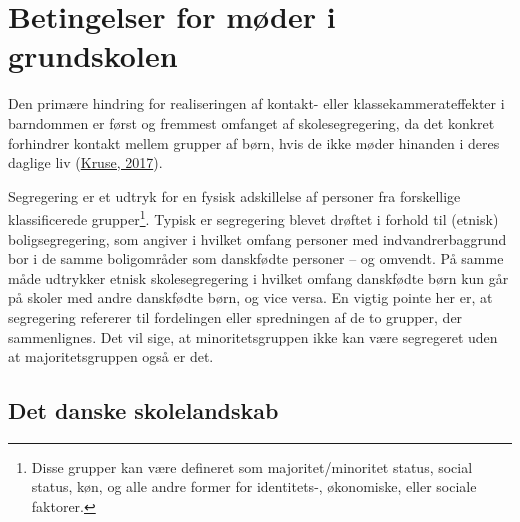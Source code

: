 \documentclass[
]{book}
\begin{document}
\hypertarget{betingelser-for-muxf8der-i-grundskolen}{%
\section{Betingelser for møder i grundskolen}\label{betingelser-for-muxf8der-i-grundskolen}}

Den primære hindring for realiseringen af kontakt- eller klassekammerateffekter i barndommen er først og fremmest omfanget af skolesegregering, da det konkret forhindrer kontakt mellem grupper af børn, hvis de ikke møder hinanden i deres daglige liv (\protect\hyperlink{ref-kruse2017}{Kruse, 2017}).

Segregering er et udtryk for en fysisk adskillelse af personer fra forskellige klassificerede grupper\footnote{Disse grupper kan være defineret som majoritet/minoritet status, social status, køn, og alle andre former for identitets-, økonomiske, eller sociale faktorer.}. Typisk er segregering blevet drøftet i forhold til (etnisk) boligsegregering, som angiver i hvilket omfang personer med indvandrerbaggrund bor i de samme boligområder som danskfødte personer -- og omvendt. På samme måde udtrykker etnisk skolesegregering i hvilket omfang danskfødte børn kun går på skoler med andre danskfødte børn, og vice versa. En vigtig pointe her er, at segregering refererer til fordelingen eller spredningen af de to grupper, der sammenlignes. Det vil sige, at minoritetsgruppen ikke kan være segregeret uden at majoritetsgruppen også er det.

\hypertarget{det-danske-skolelandskab}{%
\subsection{Det danske skolelandskab}\label{det-danske-skolelandskab}}
\end{document}
